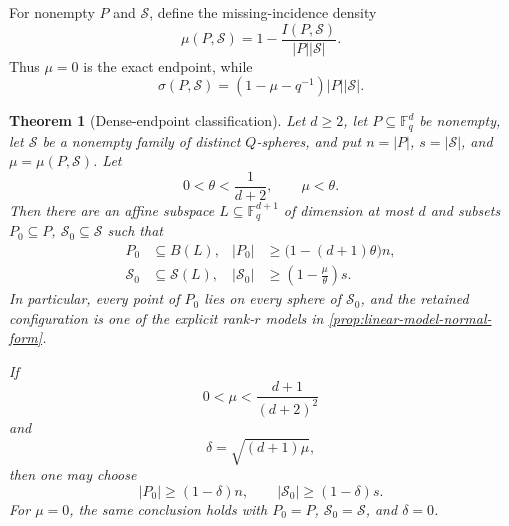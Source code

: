 \documentclass[11pt,letterpaper]{amsart}
\newtheorem{theorem}{Theorem}[section]
\theoremstyle{definition}
\theoremstyle{remark}
\newcommand{\1}{\mathbf 1}
\begin{document}
For nonempty $P$ and $\mathcal S$, define the missing-incidence density
\begin{equation}\label{eq:missing-density}
 \mu(P,\mathcal S)=1-\frac{I(P,\mathcal S)}{|P||\mathcal S|}.
\end{equation}
Thus $\mu=0$ is the exact endpoint, while
\[
 \sigma(P,\mathcal S)=(1-\mu-q^{-1})|P||\mathcal S|.
\]

\begin{theorem}[Dense-endpoint classification]\label{thm:dense-freiman}
Let $d\ge2$, let $P\subseteq\mathbb F_q^d$ be nonempty, let $\mathcal S$ be a nonempty family of distinct $Q$-spheres, and put $n=|P|$, $s=|\mathcal S|$, and $\mu=\mu(P,\mathcal S)$.  Let
\[
 0<\theta<\frac1{d+2},\qquad \mu<\theta.
\]
Then there are an affine subspace $L\subseteq\mathbb F_q^{d+1}$ of dimension at most $d$ and subsets $P_0\subseteq P$, $\mathcal S_0\subseteq\mathcal S$ such that
\begin{align}
 P_0&\subseteq B(L),&
 |P_0|&\ge\bigl(1-(d+1)\theta\bigr)n,\label{eq:dense-P0}\\
 \mathcal S_0&\subseteq\mathcal S(L),&
 |\mathcal S_0|&\ge\left(1-\frac\mu\theta\right)s.
 \label{eq:dense-S0}
\end{align}
In particular, every point of $P_0$ lies on every sphere of $\mathcal S_0$, and the retained configuration is one of the explicit rank-$r$ models in \cref{prop:linear-model-normal-form}.

If
\begin{equation}\label{eq:dense-small-mu}
 0<\mu<\frac{d+1}{(d+2)^2}
\end{equation}
and
\[
 \delta=\sqrt{(d+1)\mu},
\]
then one may choose
\begin{equation}\label{eq:dense-symmetric}
 |P_0|\ge(1-\delta)n,
 \qquad
 |\mathcal S_0|\ge(1-\delta)s.
\end{equation}
For $\mu=0$, the same conclusion holds with $P_0=P$, $\mathcal S_0=\mathcal S$, and $\delta=0$.
\end{theorem}
\end{document}
